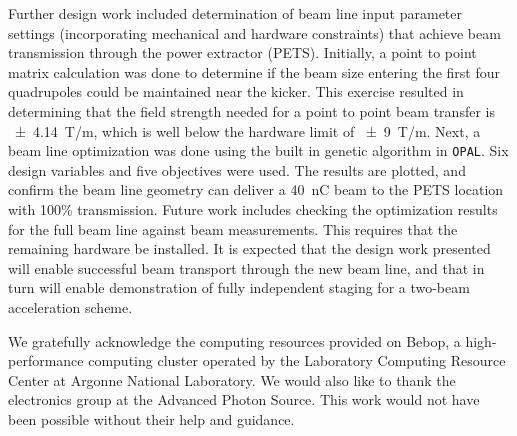 \documentclass[aps,prab,preprint,groupedaddress,linenumbers]{revtex4-2}
\begin{document}
Further design work included determination of beam line input parameter settings (incorporating 
mechanical and hardware constraints) that achieve beam transmission through the power extractor (PETS).
Initially, a point to point matrix calculation was done to determine if the 
beam size entering the first four quadrupoles could be maintained near the kicker.
This exercise resulted in determining that the field strength needed for a point to point beam transfer is \SI{\pm 4.14}{T/m}, 
which is well below the hardware limit of \SI{\pm9}{T/m}. 
Next, a beam line optimization was done using the built in genetic algorithm in \verb|OPAL|.  
Six design variables and five objectives were used. 
The results are plotted, and confirm the beam line geometry can deliver 
a \SI{40}{nC} beam to the PETS location with 100\% transmission.
Future work includes checking the optimization results for the full beam line against beam measurements.  
This requires that the remaining hardware be installed.  
It is expected that the design work presented will enable successful beam transport through the new beam line, 
and that in turn will enable demonstration of fully independent staging for a two-beam acceleration scheme. 






\begin{acknowledgments}
We gratefully acknowledge the computing resources provided on Bebop, 
a high-performance computing cluster operated by the Laboratory Computing 
Resource Center at Argonne National Laboratory.
We would also like to thank the electronics group at the Advanced Photon Source. 
This work would not have been possible without their help and guidance.
\end{acknowledgments}


\end{document}
